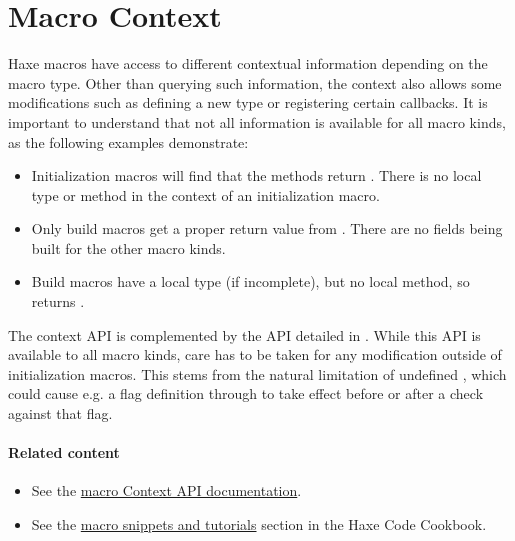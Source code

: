 \section{Macro Context}
\label{macro-context}


Haxe macros have access to different contextual information depending on the macro type. Other than querying such information, the context also allows some modifications such as defining a new type or registering certain callbacks. It is important to understand that not all information is available for all macro kinds, as the following examples demonstrate:

\begin{itemize}
	\item Initialization macros will find that the  methods return . There is no local type or method in the context of an initialization macro.
	\item Only build macros get a proper return value from . There are no fields being built for the other macro kinds.
	\item Build macros have a local type (if incomplete), but no local method, so  returns .
\end{itemize}

The context API is complemented by the  API detailed in . While this API is available to all macro kinds, care has to be taken for any modification outside of initialization macros. This stems from the natural limitation of undefined , which could cause e.g. a flag definition through  to take effect before or after a  check against that flag.

\paragraph{Related content}
\begin{itemize}
	\item See the \href{http://api.haxe.org/haxe/macro/Context.html}{macro Context API documentation}. 
	\item See the \href{http://code.haxe.org/category/macros/}{macro snippets and tutorials} section in the Haxe Code Cookbook.
\end{itemize}

